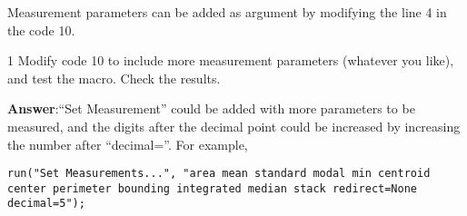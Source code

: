 Measurement parameters can be added as argument by modifying the line 4 in the code 10.

\begin{indentexercise}
{1}
Modify code 10 to include more measurement parameters (whatever you like), and test the macro. Check the results. 

\item \textbf{Answer}:``Set Measurement'' could be added with more parameters to be measured, and the digits after the decimal point could be increased by increasing the number after ``decimal=''. For example, 
\begin{lstlisting}[numbers=none]
run("Set Measurements...", "area mean standard modal min centroid center perimeter bounding integrated median stack redirect=None decimal=5");
\end{lstlisting}

\end{indentexercise}